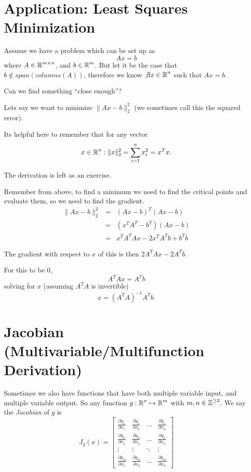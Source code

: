 \section{Application: Least Squares Minimization}
Assume we have a problem which can be set up as 
\[Ax=b\]
where $A\in\operatorname{\mathbb{R}}^{m\times n}$, and $b\in\operatorname{\mathbb{R}}^m$.
But let it be the case that $b\notin span(columns(A))$,
therefore we know $\not\exists x\in\operatorname{\mathbb{R}}^n$ such that $Ax=b$.

Can we find something ``close enough''?

Lets say we want to minimize $\|Ax-b\|_2^2$ (we sometimes call this the squared error). 
\begin{aside}
Its helpful here to remember that for any vector \[x\in\operatorname{\mathbb{R}}^n: \|x\|_2^2 = \sum_{i=1}^n x_i^2 = x^Tx.\]

The derivation is left as an exercise.
\end{aside}

Remember from above, to find a minimum we need to find the critical points and evaluate them, so we need to find the gradient. 
\[\begin{array}{ccc}
\|Ax-b\|_2^2 & = & (Ax-b)^T(Ax-b)\\
& = & (x^TA^T-b^T)(Ax-b)\\
& = & x^TA^TAx-2x^TA^Tb+b^Tb
\end{array}\]

The gradient with respect to $x$ of this is then $2A^TAx-2A^Tb$.

For this to be 0, \[A^TAx=A^Tb\]
solving for $x$ (assuming $A^TA$ is invertible)
\[x = (A^TA)^{-1}A^Tb.\]


\section{Jacobian (Multivariable/Multifunction Derivation)}
Sometimes we also have functions that have both multiple variable input, and multiple variable output. 
So any function $g: \operatorname{\mathbb{R}}^n\mapsto\operatorname{\mathbb{R}}^m$ with $m,n\in\operatorname{\mathbb{Z}}^{\ge2}$.
We say the \emph{Jacobian} of $g$ is 
\[J_g(x) = \begin{bmatrix}
\frac{\partial g_1}{\partial x_1} & \frac{\partial g_1}{\partial x_2} & \hdots & \frac{\partial g_1}{\partial x_n} \\  
\frac{\partial g_2}{\partial x_1} & \frac{\partial g_2}{\partial x_2} & \hdots & \frac{\partial g_2}{\partial x_n} \\  
\vdots & \vdots & \ddots & \vdots\\
\frac{\partial g_m}{\partial x_1} & \frac{\partial g_m}{\partial x_2} & \hdots & \frac{\partial g_m}{\partial x_n} \end{bmatrix}\]

